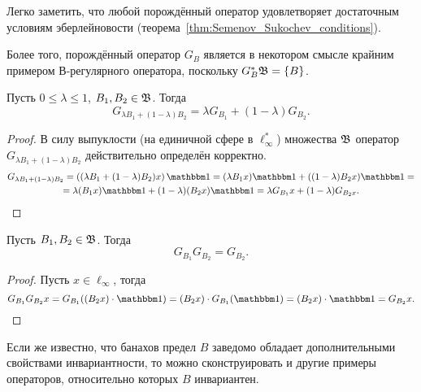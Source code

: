 \begin{remark}
	Легко заметить, что любой порождённый оператор удовлетворяет достаточным условиям эберлейновости
	(теорема~\ref{thm:Semenov_Sukochev_conditions}).
\end{remark}

\begin{remark}
	Более того, порождённый оператор $G_B$ является в некотором смысле крайним примером В-регулярного оператора,
	поскольку $G_B^* \mathfrak{B} = \{B\}$.
\end{remark}

\begin{lemma}
	Пусть $0 \leq \lambda \leq 1$, $B_1, B_2 \in \mathfrak{B}$.
	Тогда
	\begin{equation}
		G_{\lambda B_1+(1-\lambda) B_2} =\lambda G_{B_1} + (1-\lambda)G_{B_2}
		.
	\end{equation}
\end{lemma}


\begin{proof}
	В силу выпуклости (на единичной сфере в $\ell_\infty^*$) множества $\mathfrak{B}$ оператор $G_{\lambda B_1+(1-\lambda) B_2}$
	действительно определён корректно.
	\begin{multline}
		G_{\lambda B_1+(1-\lambda) B_2} =
		\left((\lambda B_1+(1-\lambda) B_2) x\right)\one =
		(\lambda B_1 x) \one +((1-\lambda) B_2 x)\one =
		\\=
		\lambda (B_1 x) \one +(1-\lambda) (B_2 x)\one =
		\lambda G_{B_1} x +(1-\lambda) G_{B_2 x}
		.
	\end{multline}
\end{proof}


\begin{lemma}
	Пусть $B_1, B_2 \in \mathfrak{B}$.
	Тогда
	\begin{equation}
		G_{B_1} G_{B_2} = G_{B_2}
		.
	\end{equation}
\end{lemma}
\begin{proof}
	Пусть $x\in\ell_\infty$, тогда
	\begin{equation}
		G_{B_1}G_{B_2}x =
		G_{B_1} ( (B_2 x) \cdot \one ) =
		(B_2 x) \cdot G_{B_1} ( \one ) =
		(B_2 x) \cdot  \one =
		G_{B_2}x
		.
	\end{equation}
\end{proof}


Если же известно, что банахов предел $B$ заведомо обладает дополнительными свойствами инвариантности,
то можно сконструировать и другие примеры операторов, относительно которых $B$ инвариантен.

